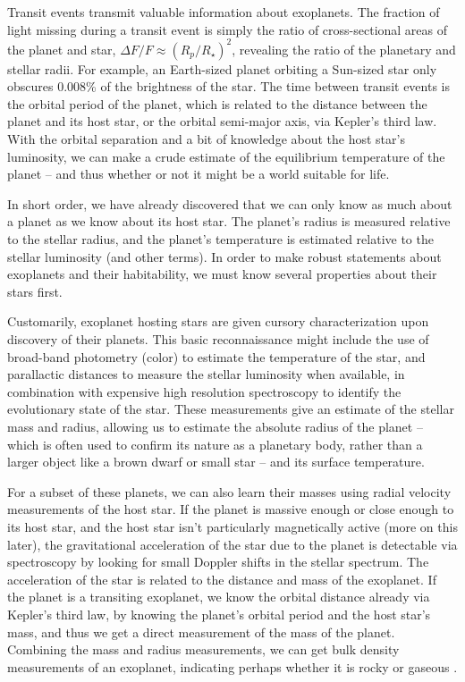 Transit events transmit valuable information about exoplanets. The fraction of light missing during a transit event is simply the ratio of cross-sectional areas of the planet and star, $\Delta F/F \approx (R_p/R_\star)^2$, revealing the ratio of the planetary and stellar radii. For example, an Earth-sized planet orbiting a Sun-sized star only obscures 0.008\% of the brightness of the star. The time between transit events is the orbital period of the planet, which is related to the distance between the planet and its host star, or the orbital semi-major axis, via Kepler's third law. With the orbital separation and a bit of knowledge about the host star's luminosity, we can make a crude estimate of the equilibrium temperature of the planet -- and thus whether or not it might be a world suitable for life.

In short order, we have already discovered that we can only know as much about a planet as we know about its host star. The planet's radius is measured relative to the stellar radius, and the planet's temperature is estimated relative to the stellar luminosity (and other terms). In order to make robust statements about exoplanets and their habitability, we must know several properties about their stars first.  

Customarily, exoplanet hosting stars are given cursory characterization upon discovery of their planets. This basic reconnaissance might include the use of broad-band photometry (color) to estimate the temperature of the star, and parallactic distances to measure the stellar luminosity when available, in combination with expensive high resolution spectroscopy to identify the evolutionary state of the star. These measurements give an estimate of the stellar mass and radius, allowing us to estimate the absolute radius of the planet -- which is often used to confirm its nature as a planetary body, rather than a larger object like a brown dwarf or small star -- and its surface temperature. 

For a subset of these planets, we can also learn their masses using radial velocity measurements of the host star. If the planet is massive enough or close enough to its host star, and the host star isn't particularly magnetically active (more on this later), the gravitational acceleration of the star due to the planet is detectable via spectroscopy by looking for small Doppler shifts in the stellar spectrum. The acceleration of the star is related to the distance and mass of the exoplanet. If the planet is a transiting exoplanet, we know the orbital distance already via Kepler's third law, by knowing the planet's orbital period and the host star's mass, and thus we get a direct measurement of the mass of the planet. Combining the mass and radius measurements, we can get bulk density measurements of an exoplanet, indicating perhaps whether it is rocky or gaseous \citep{Seager2007}. 

